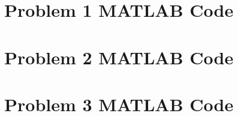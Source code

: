 \documentclass[../main.tex]{subfiles}
\begin{document}
	\begin{appendices}
		\section{Problem 1 MATLAB Code}
		\label{Problem1MATLAB}
		
		\newpage

		\section{Problem 2 MATLAB Code}
		\label{Problem2MATLAB}
		
		\newpage
		
		\section{Problem 3 MATLAB Code}
		\label{Problem3MATLAB}
		

		\newpage
	\end{appendices}
\end{document}
